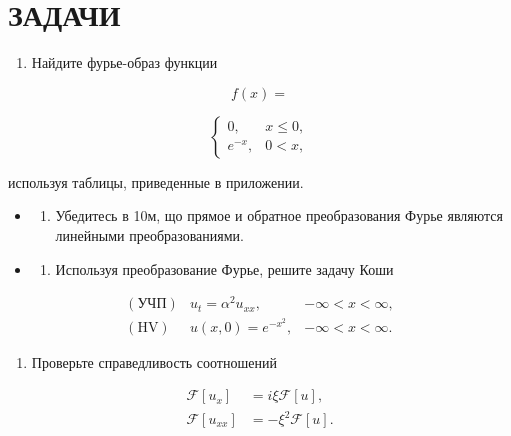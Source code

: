 \documentclass[
  ukrainian,
]{article}
\providecommand{\tightlist}{%
  \setlength{\itemsep}{0pt}\setlength{\parskip}{0pt}}
\begin{document}
\section{ЗАДАЧИ}\label{ux437ux430ux434ux430ux447ux438-1}

\begin{enumerate}
\def\labelenumi{\arabic{enumi}.}
\tightlist
\item
  Найдите фурье-образ функции
\end{enumerate}

\[
f(x) =
\]

\[
\begin{cases} 0, & x \leq 0, \\ e^{-x}, & 0 < x, \end{cases}
\]

используя таблицы, приведенные в приложении.

\begin{itemize}
\tightlist
\item
  \begin{enumerate}
  \def\labelenumi{\arabic{enumi}.}
  \setcounter{enumi}{1}
  \tightlist
  \item
    Убедитесь в 10м, що прямое и обратное преобразования Фурье являются
    линейными преобразованиями.
  \end{enumerate}
\item
  \begin{enumerate}
  \def\labelenumi{\arabic{enumi}.}
  \setcounter{enumi}{2}
  \tightlist
  \item
    Используя преобразование Фурье, решите задачу Коши
  \end{enumerate}
\end{itemize}

\[
\begin{aligned} (\text{УЧП}) & u_t = \alpha^2 u_{xx}, & -\infty < x < \infty, \\ (\text{HV}) & u(x, 0) = e^{-x^2}, & -\infty < x < \infty. \end{aligned}
\]

\begin{enumerate}
\def\labelenumi{\arabic{enumi}.}
\setcounter{enumi}{3}
\tightlist
\item
  Проверьте справедливость соотношений
\end{enumerate}

\[
\begin{aligned} \mathcal{F}\left[u_{x}\right] &= i\xi \mathcal{F}\left[u\right], \\ \mathcal{F}\left[u_{xx}\right] &= -\xi^{2} \mathcal{F}\left[u\right]. \end{aligned}
\]
\end{document}
